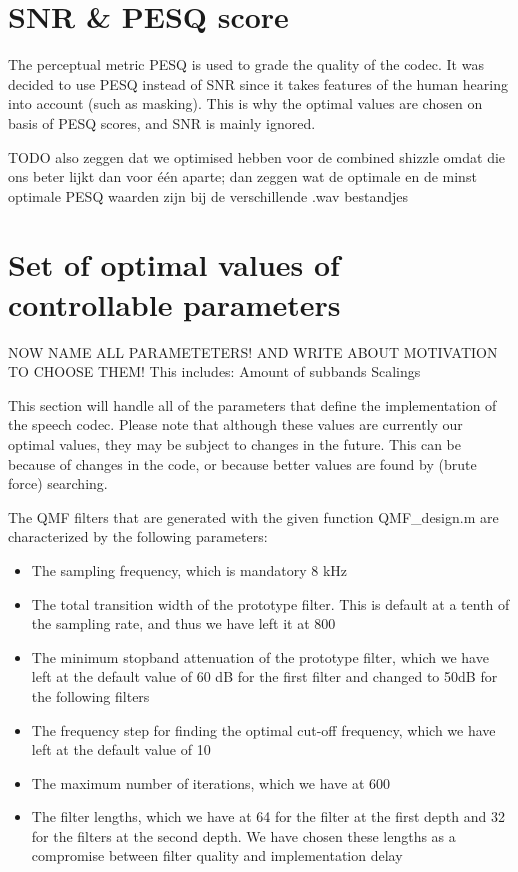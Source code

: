 \documentclass[a4paper]{article}
\begin{document}
\section{SNR \& PESQ score}
The perceptual metric PESQ is used to grade the quality of the codec. It was decided to use PESQ instead of SNR since it takes features of the human hearing into account (such as masking). This is why the optimal values are chosen on basis of PESQ scores, and SNR is mainly ignored.

TODO also zeggen dat we optimised hebben voor de combined shizzle omdat die ons beter lijkt dan voor één aparte; dan zeggen wat de optimale en de minst optimale PESQ waarden zijn bij de verschillende .wav bestandjes


\section{Set of optimal values of controllable parameters}
NOW NAME ALL PARAMETETERS! AND WRITE ABOUT MOTIVATION TO CHOOSE THEM! This includes:
Amount of subbands
Scalings

This section will handle all of the parameters that define the implementation of the speech codec. Please note that although these values are currently our optimal values, they may be subject to changes in the future. This can be because of changes in the code, or because better values are found by (brute force) searching.

The QMF filters that are generated with the given function QMF\_design.m are characterized by the following parameters:

\begin{itemize}
\item The sampling frequency, which is mandatory 8 kHz
\item The total transition width of the prototype filter. This is default at a tenth of the sampling rate, and thus we have left it at 800
\item The minimum stopband attenuation of the prototype filter, which we have left at the default value of 60 dB for the first filter and changed to 50dB for the following filters
\item The frequency step for finding the optimal cut-off frequency, which we have left at the default value of 10
\item The maximum number of iterations, which we have at 600
\item The filter lengths, which we have at 64 for the filter at the first depth and 32 for the filters at the second depth. We have chosen these lengths as a compromise between filter quality and implementation delay
\
\end{itemize}
\end{document}
